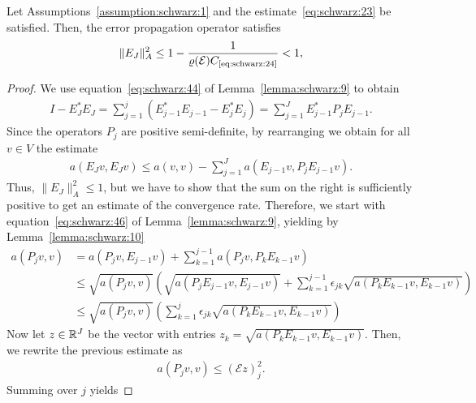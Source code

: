 \begin{theorem}
  Let Assumptions~\ref{assumption:schwarz:1} and the
  estimate~\eqref{eq:schwarz:23} be satisfied. Then, the error
  propagation operator satisfies
  \begin{gather}
    \label{eq:schwarz:47}
    \|E_J\|_A^2 \le 1 - \frac{1}{\rho(\mathcal E) \constref{eq:schwarz:24}} < 1,
  \end{gather}
\end{theorem}

\begin{proof}
  We use equation~\eqref{eq:schwarz:44} of Lemma~\ref{lemma:schwarz:9} to obtain
  \begin{gather*}
    I- E^*_J E_J = \sum_{j=1}^{j} \left(E^*_{j-1}E_{j-1} -
      E^*_{j}E_{j}\right)
    = \sum_{j=1}^J E^*_{j-1} P_j E_{j-1}.
  \end{gather*}
  Since the operators $P_j$ are positive semi-definite, by rearranging
  we obtain for all $v\in V$ the estimate
  \begin{gather}
    \label{eq:schwarz:49}
    a(E_J v, E_J v) \le a(v,v) - \sum_{j=1}^J a(E_{j-1}v, P_j E_{j-1}v).
  \end{gather}
  Thus, $\|E_J\|_A^2 \le 1$, but we have to show that the sum on the
  right is sufficiently positive to get an estimate of the convergence
  rate. Therefore, we start with equation~\eqref{eq:schwarz:46} of
  Lemma~\ref{lemma:schwarz:9}, yielding by Lemma~\ref{lemma:schwarz:10}
  \begin{align*}
    a(P_j v,v)
    &= a(P_j v, E_{j-1}v) + \sum_{k=1}^{j-1} a(P_j v, P_k E_{k-1} v)
    \\
    &\le \sqrt{a(P_j v,v)} \left(\sqrt{a(P_j E_{j-1}v,E_{j-1}v)}
    + \sum_{k=1}^{j-1} \epsilon_{jk} \sqrt{a(P_k E_{k-1}v,E_{k-1}v)}
    \right) \\
    & \le \sqrt{a(P_j v,v)} \left(\sum_{k=1}^{j} \epsilon_{jk}
      \sqrt{a(P_k E_{k-1} v,E_{k-1} v)}
    \right)
  \end{align*}
  Now let $z \in \mathbb R^J$ be the vector with entries $z_k = \sqrt{a(P_k
    E_{k-1}v,E_{k-1}v)}$. Then, we rewrite the previous estimate as
  \begin{gather*}
    a(P_j v,v) \le (\mathcal E z)_j^2.
  \end{gather*}
  Summing over $j$ yields
  

\end{proof}
